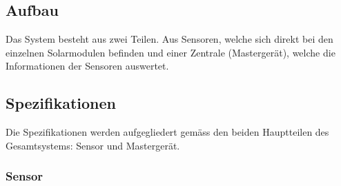 \subsection{Aufbau}

Das System besteht  aus zwei Teilen. Aus Sensoren, welche sich  direkt bei den
einzelnen Solarmodulen befinden und einer Zentrale (Masterger\"at), welche die
Informationen der Sensoren auswertet.



\subsection{Spezifikationen}
\label{subsec:specs}

Die Spezifikationen  werden aufgegliedert gem\"ass den  beiden Hauptteilen des
Gesamtsystems: Sensor und Masterger\"at.

\subsubsection{Sensor}

